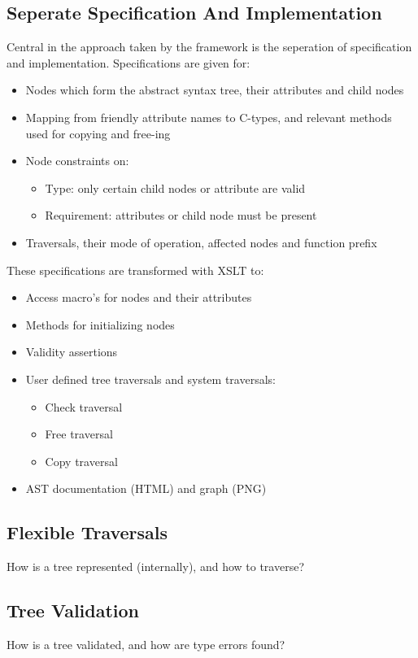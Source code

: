 \documentclass[twoside,openright]{uva-bachelor-thesis}
\begin{document}
		\subsection{Seperate Specification And Implementation}
			Central in the approach taken by the framework is the seperation of specification and implementation. Specifications are given for:
			\begin{itemize}
				\item Nodes which form the abstract syntax tree, their attributes and child nodes
				\item Mapping from friendly attribute names to C-types, and relevant methods used for copying and free-ing
				\item Node constraints on:
				\begin{itemize}
					\item Type: only certain child nodes or attribute are valid
					\item Requirement: attributes or child node must be present
				\end{itemize}
				\item Traversals, their mode of operation, affected nodes and function prefix
			\end{itemize}
			These specifications are transformed with XSLT to:
			\begin{itemize}
				\item Access macro's for nodes and their attributes
				\item Methods for initializing nodes
				\item Validity assertions
				\item User defined tree traversals and system traversals:
				\begin{itemize}
					\item Check traversal
					\item Free traversal
					\item Copy traversal
				\end{itemize}
				\item AST documentation (HTML) and graph (PNG)
			\end{itemize}
		
		\subsection{Flexible Traversals}
			How is a tree represented (internally), and how to traverse?
			
		\subsection{Tree Validation}
			How is a tree validated, and how are type errors found?
	
\end{document}
